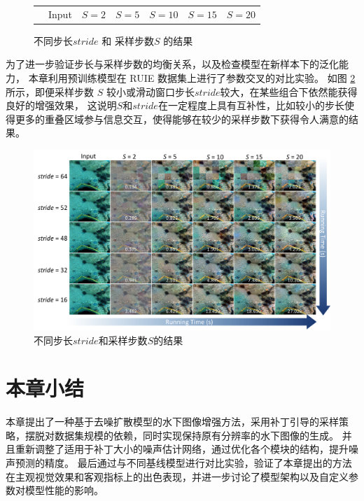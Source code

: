 \begin{figure}[ht]
\begin{center}
\begin{tabular}{ccccccc}
            \multicolumn{1}{c}{} & \small Input & \hspace{-0.36cm} \small $S=2$ & \hspace{-0.36cm} \small $S=5$ & \hspace{-0.36cm} \small $S=10$ & \hspace{-0.36cm} \small $S=15$ & \hspace{-0.36cm} \small $S=20$ \\
        \end{tabular}
    \end{center}
    \vspace{-6mm}
    \caption{\label{img:stride-S} 不同步长$stride$ 和 采样步数$S$ 的结果}
    \vspace{-4mm}
\end{figure}

为了进一步验证步长与采样步数的均衡关系，以及检查模型在新样本下的泛化能力，
本章利用预训练模型在 RUIE \cite{RUIE} 数据集上进行了参数交叉的对比实验。
如图 \ref{img:param} 所示，即便采样步数 $S$ 较小或滑动窗口步长$stride$较大，在某些组合下依然能获得良好的增强效果，
这说明$S$和$stride$在一定程度上具有互补性，比如较小的步长使得更多的重叠区域参与信息交互，使得能够在较少的采样步数下获得令人满意的结果。
\begin{figure}
    \centering
    \includegraphics[width=0.98\linewidth]{figures/ch3/compare/discussion/param.pdf}
    \caption{\label{img:param}不同步长$stride$和采样步数$S$的结果}
\end{figure}

\section{本章小结}
本章提出了一种基于去噪扩散模型的水下图像增强方法，采用补丁引导的采样策略，摆脱对数据集规模的依赖，同时实现保持原有分辨率的水下图像的生成。
并且重新调整了适用于补丁大小的噪声估计网络，通过优化各个模块的结构，提升噪声预测的精度。
最后通过与不同基线模型进行对比实验，验证了本章提出的方法在主观视觉效果和客观指标上的出色表现，并进一步讨论了模型架构以及自定义参数对模型性能的影响。



